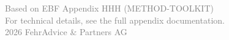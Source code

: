 \documentclass[11pt,a4paper]{article}
\begin{document}
\vfill
\begin{center}
\textcolor{gray}{\small
Based on EBF Appendix HHH (METHOD-TOOLKIT)\\
For technical details, see the full appendix documentation.\\[0.5em]
\textcopyright{} 2026 FehrAdvice \& Partners AG
}
\end{center}
\end{document}
